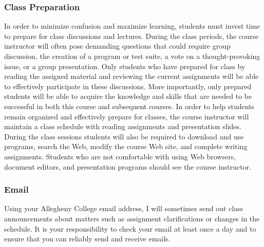 \vspace*{-.2in}
\subsubsection*{Class Preparation}

%

In order to minimize confusion and maximize learning, students must invest time to prepare for class discussions and
lectures.  During the class periods, the course instructor will often pose demanding questions that could require group
discussion, the creation of a program or test suite, a vote on a thought-provoking issue, or a group presentation.
Only students who have prepared for class by reading the assigned material and reviewing the current assignments will be
able to effectively participate in these discussions.  More importantly, only prepared students will be able to acquire
the knowledge and skills that are needed to be successful in both this course and subsequent courses.  In order to help
students remain organized and effectively prepare for classes, the course instructor will maintain a class schedule with
reading assignments and presentation slides.   During the class sessions students will also be required to download and
use programs, search the Web, modify the course Web site, and complete writing assignments.  Students who are
not comfortable with using Web browsers, document editors, and presentation programs should see the course instructor.

\subsubsection*{Email}

Using your Allegheny College email address, I will sometimes send out class announcements about matters such as
assignment clarifications or changes in the schedule. It is your responsibility to check your email at least once a day
and to ensure that you can reliably send and receive emails.

